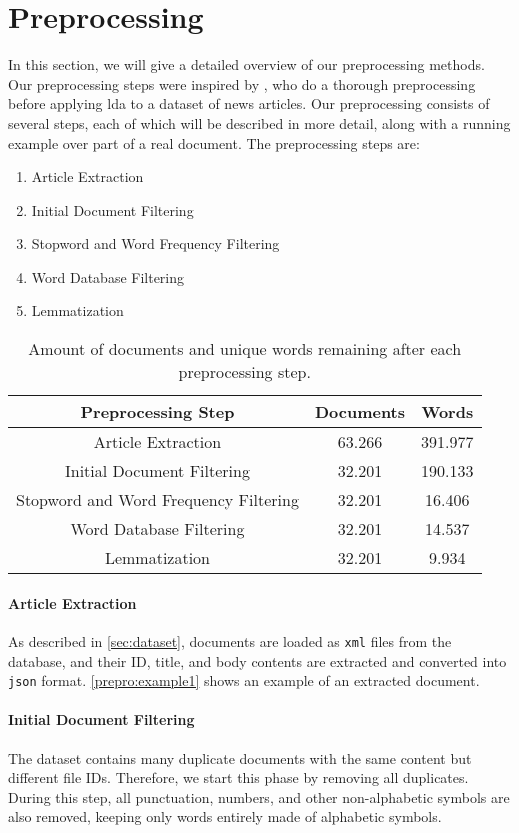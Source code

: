 \section{Preprocessing}\label{sec:prepro}

In this section, we will give a detailed overview of our preprocessing methods.
Our preprocessing steps were inspired by \cite{quanti}, who do a thorough preprocessing before applying \gls{lda} to a dataset of news articles. 
Our preprocessing consists of several steps, each of which will be described in more detail, along with a running example over part of a real document.
The preprocessing steps are:
\begin{enumerate}[label=\alph*)]
	\item Article Extraction
	\item Initial Document Filtering
	\item Stopword and Word Frequency Filtering
	\item Word Database Filtering
	\item Lemmatization 
\end{enumerate}

\begin{table}
	\begin{tabular}{c|c|c}
		Preprocessing Step & Documents & Words\\
		\hline
		Article Extraction & 63.266 & 391.977 \\ 
		Initial Document Filtering & 32.201 & 190.133 \\ 
		Stopword and Word Frequency Filtering & 32.201 & 16.406 \\
		Word Database Filtering & 32.201 & 14.537 \\
		Lemmatization & 32.201 & 9.934\\
	\end{tabular}
	\label{tab:prepro_doc_word}
	\caption{Amount of documents and unique words remaining after each preprocessing step.}
\end{table}

\paragraph{Article Extraction}
As described in \autoref{sec:dataset}, documents are loaded as \texttt{xml} files from the database, and their ID, title, and body contents are extracted and converted into \texttt{json} format.
\autoref{prepro:example1} shows an example of an extracted document.

\paragraph{Initial Document Filtering}
The dataset contains many duplicate documents with the same content but different file IDs.
Therefore, we start this phase by removing all duplicates.
During this step, all punctuation, numbers, and other non-alphabetic symbols are also removed, keeping only words entirely made of alphabetic symbols.

